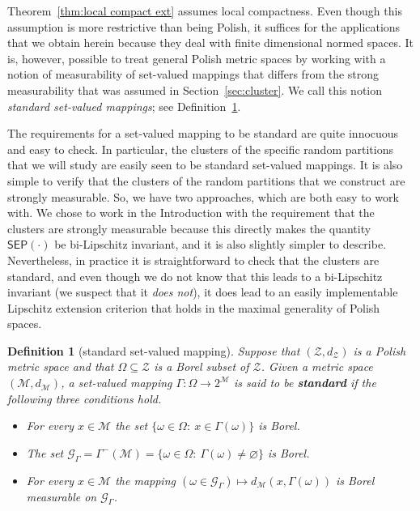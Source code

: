 \documentclass[11pt,reqno]{amsart}
\newtheorem{definition}[theorem]{Definition}
\theoremstyle{remark}
\newcommand{\MM}{\mathcal{M}}
\renewcommand{\subset}{\subseteq}
\renewcommand{\emptyset}{\varnothing}
\renewcommand{\1}{\mathbf 1}
\newcommand{\ZZ}{\mathcal{Z}}
\newcommand{\sep}{\mathsf{SEP}}
\newcommand{\cG}{\mathscr{G}}
\begin{document}
Theorem~\ref{thm:local compact ext} assumes local compactness. Even though this assumption is more restrictive than being Polish, it  suffices for the applications that we obtain herein because they deal with finite dimensional normed spaces. It is, however, possible to treat general Polish metric spaces by working with a notion of measurability of set-valued mappings that differs from the strong measurability that was assumed in Section~\ref{sec:cluster}. We call this notion {\em standard set-valued mappings}; see Definition~\ref{def:standard def}.

The requirements for a set-valued mapping to be standard are quite innocuous and easy to check. In particular, the clusters of the specific random partitions that we will study  are easily seen to be standard set-valued mappings. It is also simple to verify that the clusters of the random partitions that we construct are strongly measurable. So, we have two approaches, which are both easy to work with. We chose to work in the Introduction with the requirement that the clusters are strongly measurable because this directly makes the quantity $\sep(\cdot)$ be bi-Lipschitz invariant, and it is also slightly simpler to describe. Nevertheless, in practice it is straightforward  to check that the clusters are standard, and even though we do not know that this leads to a bi-Lipschitz invariant (we suspect that it {\em does not}), it does lead to an easily implementable Lipschitz extension criterion that holds  in the maximal generality of Polish spaces.



\begin{definition}[standard set-valued mapping]\label{def:standard def} Suppose that $(\ZZ,d_\ZZ)$ is a Polish metric space and that $\Omega\subset \ZZ$ is a Borel subset of $\ZZ$. Given a metric space $(\MM, d_\MM)$, a set-valued mapping $\Gamma:\Omega\to 2^\MM$ is said to be {\bf \em standard} if the following three conditions hold.
\begin{itemize}
\item For every $x\in \MM$ the set $\{\omega\in \Omega:\ x\in \Gamma(\omega)\}$ is Borel.
\item The set $\cG_\Gamma= \Gamma^-(\MM)=\{\omega\in \Omega:\ \Gamma(\omega)\neq\emptyset\}$ is Borel.
\item For every $x\in \MM$ the mapping $(\omega\in \cG_\Gamma)\mapsto d_\MM(x,\Gamma(\omega))$ is Borel measurable on $\cG_\Gamma$.
\end{itemize}
\end{definition}
\end{document}
